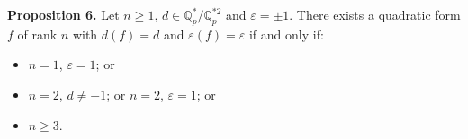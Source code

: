 \textbf{Proposition 6.} Let $n \geq 1$, $d \in \mathbb{Q}_p^*/\mathbb{Q}_p^{*2}$ and $\varepsilon = \pm 1$. There exists a quadratic form $f$ of rank $n$ with $d(f) = d$ and $\varepsilon(f) = \varepsilon$ if and only if:
\begin{itemize}
\item $n = 1$, $\varepsilon = 1$; or
\item $n = 2$, $d \neq -1$; or $n = 2$, $\varepsilon = 1$; or
\item $n \geq 3$.
\end{itemize}
